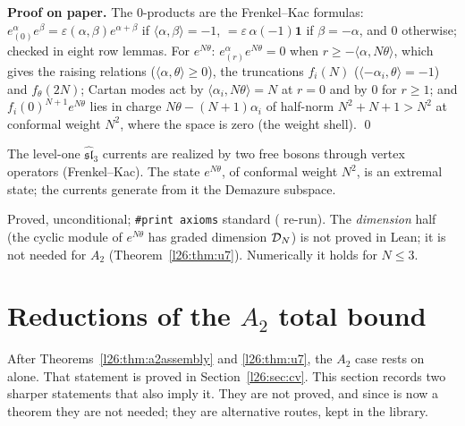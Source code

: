 \textbf{Proof on paper.} The $0$-products are the Frenkel--Kac formulas: $e^\alpha_{(0)}e^\beta=\varepsilon(\alpha,\beta)e^{\alpha+\beta}$ if
$\langle\alpha,\beta\rangle=-1$, $=\varepsilon\,\alpha(-1)\mathbf 1$ if $\beta=-\alpha$, and $0$ otherwise; checked in eight row lemmas.
For $e^{N\theta}$: $e^\alpha_{(r)}e^{N\theta}=0$ when $r\ge-\langle\alpha,N\theta\rangle$, which gives the raising relations
($\langle\alpha,\theta\rangle\ge0$), the truncations $f_i(N)$ ($\langle-\alpha_i,\theta\rangle=-1$) and $f_\theta(2N)$; Cartan modes
act by $\langle\alpha_i,N\theta\rangle=N$ at $r=0$ and by $0$ for $r\ge1$; and $f_i(0)^{N+1}e^{N\theta}$ lies in charge
$N\theta-(N+1)\alpha_i$ of half-norm $N^2+N+1>N^2$ at conformal weight $N^2$, where the space is zero (the weight shell). \qed

\begin{physics}
The level-one $\widehat{\mathfrak{sl}}_3$ currents are realized by two free bosons through vertex operators (Frenkel--Kac).
The state $e^{N\theta}$, of conformal weight $N^2$, is an extremal state; the currents generate from it the Demazure subspace.
\end{physics}

\begin{status}
Proved, unconditional; \texttt{\#print axioms} standard ( re-run). The \emph{dimension} half
(the cyclic module of $e^{N\theta}$ has graded dimension $\mathcal D_N$) is not proved in Lean; it is not needed for $A_2$
(Theorem~\ref{l26:thm:u7}). Numerically it holds for $N\le3$.
\end{status}

\section{Reductions of the $A_2$ total bound}\label{l26:sec:a2red}

After Theorems~\ref{l26:thm:a2assembly} and \ref{l26:thm:u7}, the $A_2$ case rests on  alone. That
statement is proved in Section~\ref{l26:sec:cv}. This section records two sharper statements that also imply it. They are not
proved, and since  is now a theorem they are not needed; they are alternative routes, kept in the library.

